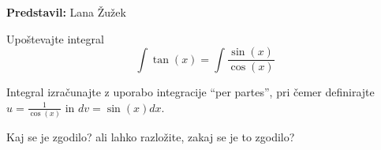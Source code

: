 \textbf{Predstavil:} Lana Žužek

Upoštevajte integral 
\[
\int \tan(x) = \int \frac{\sin(x)}{\cos(x)}
\]

Integral izračunajte z uporabo integracije “per partes”, pri čemer definirajte $u = \frac{1}{\cos(x)}$ in $dv=\sin(x) dx$.

Kaj se je zgodilo? ali lahko razložite, zakaj se je to zgodilo?